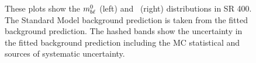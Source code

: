 \begin{figure}[p]
  \centering
  \caption{
    These plots show the $m_{b\ell}^0$ (left) and \HT\ (right) distributions
    in SR 400.
    The Standard Model background prediction is taken from the fitted
    background prediction.
    The hashed bands show the uncertainty in the fitted background prediction
    including the MC statistical and sources of systematic uncertainty.
  }
  \label{fig:sr_dists}
\end{figure}

